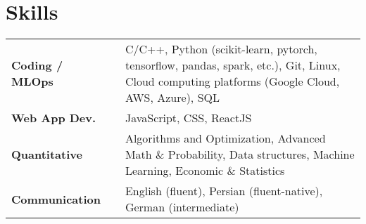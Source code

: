 \documentclass[10pt,a4paper,sans]{moderncv} %
\begin{document}
	\section{Skills}
	\renewcommand{\arraystretch}{1.25}
	\begin{tabular}{p{8em} p{1em} p{35em}}
	\textbf{Coding / MLOps} &  &   C/C++, Python (scikit-learn, pytorch, tensorflow, pandas, spark, etc.), Git, Linux, Cloud computing platforms (Google Cloud, AWS, Azure), SQL \\
	\textbf{Web App Dev.} & & JavaScript, CSS, ReactJS \\
		\textbf{Quantitative} & &  Algorithms and Optimization, Advanced Math \& Probability, Data structures, Machine Learning, Economic \& Statistics\\
		\textbf{Communication} & &  English (fluent), Persian (fluent-native), German (intermediate)
	\end{tabular}
	
%		
%		
%		
%		
%		
	
\end{document}
